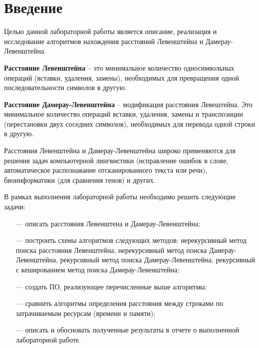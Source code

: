\chapter*{Введение}

Целью данной лабораторной работы является описание, реализация и исследование алгоритмов нахождения расстояний Левенштейна и Дамерау-Левенштейна.

\bigskip

\textbf{Расстояние Левенштейна} -- это минимальное количество односимвольных операций (вставки, удаления, замены), необходимых для превращения одной последовательности символов в другую.

\bigskip

\textbf{Расстояние Дамерау-Левенштейна} -- модификация расстояния Левештейна. Это минимальное количество операций вставки, удаления, замены и транспозиции (перестановки двух соседних символов), необходимых для перевода одной строки в другую.

\bigskip

Расстояния Левенштейна и  Дамерау-Левенштейна широко применяются для решения задач компьютерной лингвистики (исправление ошибок в слове, автоматическое распознавание отсканированного текста или речи), биоинформатики (для сравнения генов) и других.


\bigskip

В рамках выполнения лабораторной работы необходимо решить следующие задачи:

\begin{itemize}
	\item[---] описать расстояния Левенштена и Дамерау-Левенштейна;
	\item[---] построить схемы алгоритмов следующих методов: нерекурсивный метод поиска расстояния Левенштейна, нерекурсивный метод поиска Дамерау-Левенштейна, рекурсивный метод поиска Дамерау-Левенштейна, рекурсивный с кешированием метод поиска Дамерау-Левенштейна;
	\item[---] создать ПО, реализующее перечисленные выше алгоритмы;
	\item[---] сравнить алгоритмы определения расстояния между строками по затрачиваемым ресурсам (времени и памяти);
	\item[---] описать и обосновать полученные результаты в отчете о выполненной лабораторной работе.
\end{itemize}
